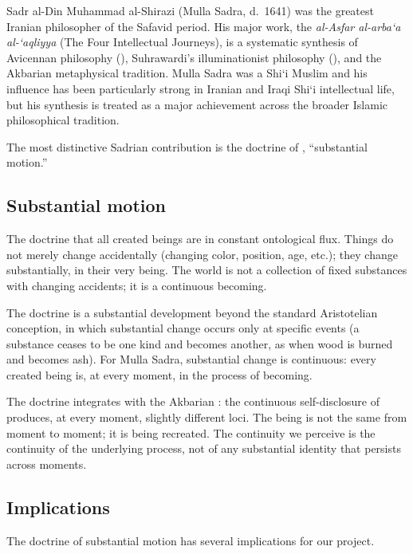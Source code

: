 Sadr al-Din Muhammad al-Shirazi (Mulla Sadra, d.~1641) was the
greatest Iranian philosopher of the Safavid period. His major work,
the \textit{al-Asfar al-arba`a al-`aqliyya} (The Four Intellectual
Journeys), is a systematic synthesis of Avicennan philosophy
(), Suhrawardi's illuminationist philosophy (),
and the Akbarian metaphysical tradition. Mulla Sadra was a Shi`i
Muslim and his influence has been particularly strong in Iranian
and Iraqi Shi`i intellectual life, but his synthesis is treated as
a major achievement across the broader Islamic philosophical
tradition.

The most distinctive Sadrian contribution is the doctrine of
, ``substantial motion.''

\subsection{Substantial motion}

\begin{conceptbox}
\label{conc:substantial-motion}
The doctrine that all created beings are in constant ontological
flux. Things do not merely change accidentally (changing color,
position, age, etc.); they change substantially, in their very
being. The world is not a collection of fixed substances with
changing accidents; it is a continuous becoming.
\end{conceptbox}

The doctrine is a substantial development beyond the standard
Aristotelian conception, in which substantial change occurs only at
specific events (a substance ceases to be one kind and becomes
another, as when wood is burned and becomes ash). For Mulla Sadra,
substantial change is continuous: every created being is, at every
moment, in the process of becoming.

The doctrine integrates with the Akbarian : the
continuous self-disclosure of  produces, at every
moment, slightly different loci. The being is not the same from
moment to moment; it is being recreated. The continuity we
perceive is the continuity of the underlying process, not of any
substantial identity that persists across moments.

\subsection{Implications}

The doctrine of substantial motion has several implications for our
project.

